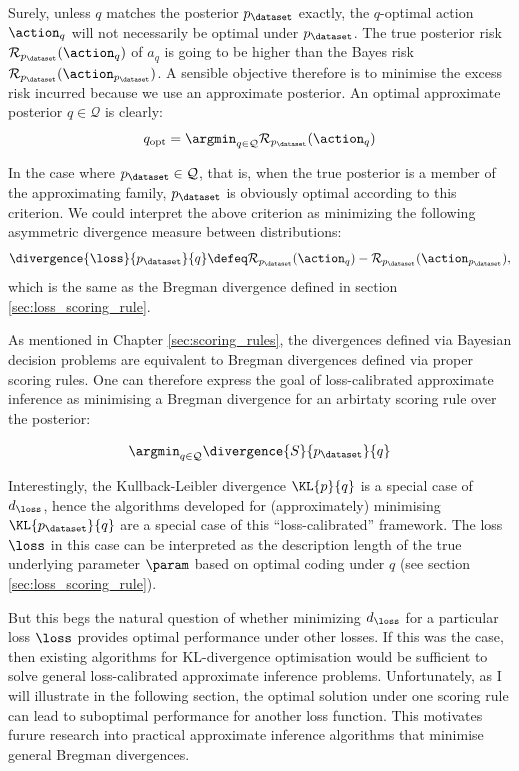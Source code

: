 Surely, unless $q$ matches the posterior $p_\dataset$ exactly, the $q$-optimal action $\action_q$ will not necessarily be optimal under $p_\dataset$. The true posterior risk $\mathcal{R}_{p_\dataset}(\action_q)$ of $a_q$ is going to be higher than the Bayes risk $\mathcal{R}_{p_\dataset}(\action_{p_\dataset})$. A sensible objective therefore is to minimise the excess risk incurred because we use an approximate posterior. An optimal approximate posterior $q \in \mathcal{Q}$ is clearly:
\begin{equation}
	q_\mathrm{opt} = \argmin_{q \in \mathcal{Q}} \mathcal{R}_{p_\dataset}(\action_q)
\end{equation}

In the case where $p_\dataset\in\mathcal{Q}$, that is, when the true posterior is a member of the approximating family, $p_\dataset$ is obviously optimal according to this criterion. We could interpret the above criterion as minimizing the following asymmetric divergence measure between distributions:
\begin{equation} \label{e:d_L}
	\divergence{\loss}{p_\dataset}{q} \defeq \mathcal{R}_{p_{\dataset}}(\action_q) - \mathcal{R}_{p_\dataset}(\action_{p_\dataset}),
\end{equation}
which is the same as the Bregman divergence defined in section \ref{sec:loss_scoring_rule}.

As mentioned in Chapter \ref{sec:scoring_rules}, the divergences defined via Bayesian decision problems are equivalent to Bregman divergences defined via proper scoring rules. One can therefore express the goal of loss-calibrated approximate inference as minimising a Bregman divergence for an arbirtaty scoring rule over the posterior:

\begin{equation}
	\argmin_{q \in \mathcal{Q}} \divergence{S}{p_{\dataset}}{q}
\end{equation}

Interestingly, the Kullback-Leibler divergence $\KL{p}{q}$ is a special case of $d_\loss$, hence the algorithms developed for (approximately) minimising  $\KL{p_\dataset}{q}$ are a special case of this ``loss-calibrated'' framework. The loss $\loss$ in this case can be interpreted as the description length of the true underlying parameter $\param$ based on optimal coding under $q$ (see section \ref{sec:loss_scoring_rule}).

But this begs the natural question of whether minimizing $d_\loss$ for a particular loss $\loss$ provides optimal performance under other losses. If this was the case, then existing algorithms for KL-divergence optimisation would be sufficient to solve general loss-calibrated approximate inference problems. Unfortunately, as I will illustrate in the following section, the optimal solution under one scoring rule can lead to suboptimal performance for another loss function. This motivates furure research into practical approximate inference algorithms that minimise general Bregman divergences.

